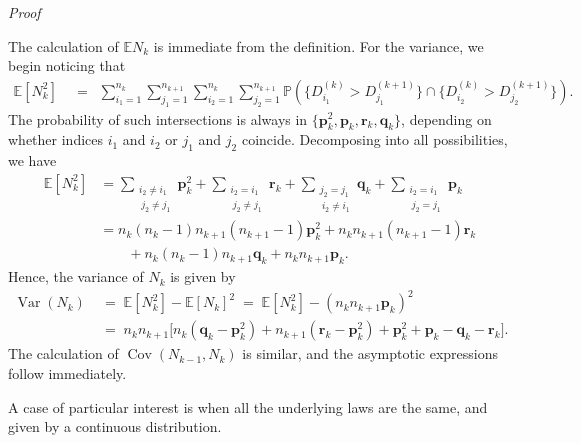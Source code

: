 \documentclass[reqno,a4paper,11pt]{amsart}
\makeatletter
\newcommand{\esp}[1]{\mathbb{E}\left[#1\right]}
\theoremstyle{remark}
\newcommand{\mb}[1]{{\mathbf #1}}
\newcommand{\bb}[1]{{\mathbb #1}}
\numberwithin{equation}{section}
\newcommand{\var}[1]{\operatorname{Var}\left(#1\right)}
\newcommand{\cov}[1]{\operatorname{Cov}\left(#1\right)}
\renewenvironment{proof}[1][Proof]{\par
\pushQED{\qed}%
\normalfont \topsep6\p@\@plus6\p@\relax
\trivlist
\item\relax
{\itshape
#1\@addpunct{.}}\hspace\labelsep\ignorespaces
}{%
\popQED\endtrivlist\@endpefalse
}
\makeatother
\begin{document}
\begin{proof}
The calculation of $\bb E N_k$ is immediate from the definition. For the
variance, we begin noticing that
\begin{align*}
\esp{N_k^2}
    &\;=\; \ \sum_{i_1=1}^{n_k}\sum_{j_1=1}^{n_{k+1}}
    \sum_{i_2=1}^{n_k}\sum_{j_2=1}^{n_{k+1}}
    \bb P\left( \{ D^{(k)}_{i_1} > D^{(k+1)}_{j_1} \}\cap\{
    D^{(k)}_{i_2} > D^{(k+1)}_{j_2}\}\right).
\end{align*}
The probability of such intersections is always in
$\{\mb p_k^2, \mb p_k, \mb r_k, \mb q_k\}$, depending on whether
indices $i_1$ and $i_2$ or $j_1$ and $j_2$ coincide.
Decomposing into all possibilities, we have
\begin{align*}
\esp{N_k^2}
    &=\sum_{\substack{i_2 \neq i_1\\~j_2\neq j_1}} \mb p_k^2
    +\sum_{\substack{i_2=i_1\\~j_2\neq j_1}} \mb r_k
    +\sum_{\substack{j_2=j_1\\~i_2 \neq i_1}} \mb q_k
    +\sum_{\substack{i_2 = i_1\\~j_2= j_1}} \mb p_k
    \\
    &=n_k(n_k-1)n_{k+1}(n_{k+1}-1) \mb p_k^2
    +n_k n_{k+1}(n_{k+1}-1) \mb r_k\\
    &\qquad +n_k(n_k-1)n_{k+1} \mb q_k
    +n_k n_{k+1} \mb p_k.
\end{align*}
Hence, the variance of $N_k$ is given by
\begin{align*}
\var{N_k}
    &\;=\; \esp{N_k^2} - \esp{N_k}^2
    \;=\; \esp{N_k^2} - (n_k n_{k+1} \mb p_k)^2 \\
    &\;=\; n_k n_{k+1}
    \bigl[n_k(\mb q_k - \mb p_k^2) + n_{k+1}(\mb r_k - \mb p_k^2)
    + \mb p_k^2 + \mb p_k -  \mb q_k -  \mb r_k
    \bigr].
\end{align*}
%
The calculation of $\cov{N_{k-1},N_k}$ is similar, and the asymptotic expressions follow immediately.
\end{proof}

A case of particular interest is when all the underlying laws are the same, and given by a continuous distribution.
\end{document}

